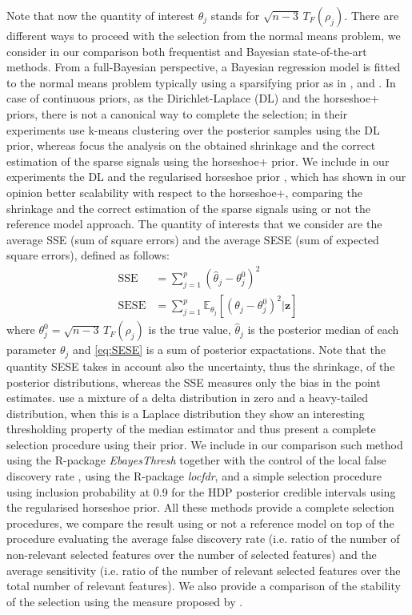 \documentclass[american,]{article}
\theoremstyle{definition}
\begin{document}
Note that now the quantity of interest $\theta_{j}$ stands for $\sqrt{n-3}\,T_{F}(\rho_{j})$. There are different ways to proceed with the selection from the normal means problem, we consider in our comparison both frequentist and Bayesian state-of-the-art methods. From a full-Bayesian perspective, a Bayesian regression model is fitted to the normal means problem typically using a sparsifying prior as in \cite{paper:dirichlet_laplace}, \cite{paper:horseshoe+} and \cite{paper:EBmed}. In case of continuous priors, as the Dirichlet-Laplace (DL) and the horseshoe+ priors, there is not a canonical way to complete the selection; in their experiments \cite{paper:dirichlet_laplace} use k-means clustering over the posterior samples using the DL prior, whereas \cite{paper:horseshoe+} focus the analysis on the obtained shrinkage and the correct estimation of the sparse signals using the horseshoe+ prior. We include in our experiments the DL and the regularised horseshoe prior \citep{paper:rhs}, which has shown in our opinion better scalability with respect to the horseshoe+, comparing the shrinkage and the correct estimation of the sparse signals using or not the reference model approach. The quantity of interests that we consider are the average SSE (sum of square errors) and the average SESE (sum of expected square errors), defined as follows:
\
\begin{align}
\text{SSE}&=\sum_{j=1}^{p}(\hat{\theta}_{j} - \theta^{0}_{j})^{2} \label{eq:SSE} \\
\text{SESE}&=\sum_{j=1}^{p}\mathbb{E}_{\theta_{j}}[(\theta_{j}-\theta^{0}_{j})^{2}|\mathbf{z}] \label{eq:SESE}
\end{align}
where $\theta_{j}^{0}=\sqrt{n-3}\,T_{F}(\rho_{j})$ is the true value, $\hat{\theta}_{j}$ is the posterior median of each parameter $\theta_{j}$ and \eqref{eq:SESE} is a sum of posterior expactations. Note that the quantity SESE takes in account also the uncertainty, thus the shrinkage, of the posterior distributions, whereas the SSE measures only the bias in the point estimates. \cite{paper:EBmed} use a mixture of a delta distribution in zero and a heavy-tailed distribution, when this is a Laplace distribution they show an interesting thresholding property of the median estimator and thus present a complete selection procedure using their prior. We include in our comparison such method using the R-package \textit{EbayesThresh} together with the control of the local false discovery rate \citep{book:efron, paper:efron}, using the R-package \textit{locfdr}, and a simple selection procedure using inclusion probability at 0.9 for the HDP posterior credible intervals using the regularised horseshoe prior. All these methods provide a complete selection procedures, we compare the result using or not a reference model on top of the procedure evaluating the average false discovery rate (i.e. ratio of the number of non-relevant selected features over the number of selected features) and the average sensitivity (i.e. ratio of the number of relevant selected features over the total number of relevant features). We also provide a comparison of the stability of the selection using the measure proposed by \cite{paper:stability}.
\end{document}
